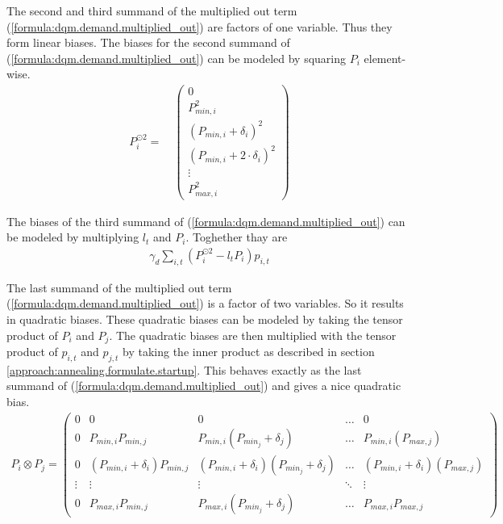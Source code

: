 The second and third summand of the multiplied out term (\ref{formula:dqm.demand.multiplied_out}) are factors of one variable.
Thus they form linear biases.
The biases for the second summand of (\ref{formula:dqm.demand.multiplied_out}) can be modeled by squaring $P_i$ element-wise.
\begin{align}
  P_i^{\odot 2} = \quad \begin{pmatrix}
    0 \\
    P_{min, i}^2 \\
    \left( P_{min, i} + \delta_i \right)^2 \\
    \left( P_{min, i} + 2 \cdot \delta_i \right)^2 \\
    \vdots \\
    P_{max, i}^2
  \end{pmatrix}
\end{align}

The biases of the third summand of (\ref{formula:dqm.demand.multiplied_out}) can be modeled by multiplying $l_t$ and $P_i$.
Toghether thay are
\begin{align}
  \gamma_d \sum_{i, t} \left( P_i^{\odot 2} - l_t P_i \right) p_{i, t}
\end{align}

The last summand of the multiplied out term (\ref{formula:dqm.demand.multiplied_out}) is a factor of two variables.
So it results in quadratic biases.
These quadratic biases can be modeled by taking the tensor product of $P_i$ and $P_j$.
The quadratic biases are then multiplied with the tensor product of $p_{i, t}$ and $p_{j, t}$ by taking the inner product as described in section \ref{approach:annealing.formulate.startup}.
This behaves exactly as the last summand of (\ref{formula:dqm.demand.multiplied_out}) and gives a nice quadratic bias.
\begin{align}
  P_i \otimes P_j = \begin{pmatrix}
    0 & 0 & 0 & \ldots & 0 \\
    0 & P_{min, i} P_{min, j} & P_{min, i} \left( P_{min_j} + \delta_j \right) & \ldots & P_{min, i} \left( P_{max, j} \right) \\
    0 & \left( P_{min, i} + \delta_i \right) P_{min, j} & \left( P_{min, i} + \delta_i \right) \left( P_{min_j} + \delta_j \right) & \ldots & \left( P_{min, i} + \delta_i \right) \left( P_{max, j} \right) \\
    \vdots & \vdots & \vdots & \ddots & \vdots \\
    0 & P_{max, i} P_{min, j} & P_{max, i} \left( P_{min_j} + \delta_j \right) & \ldots & P_{max, i} P_{max, j}
  \end{pmatrix}
\end{align}


